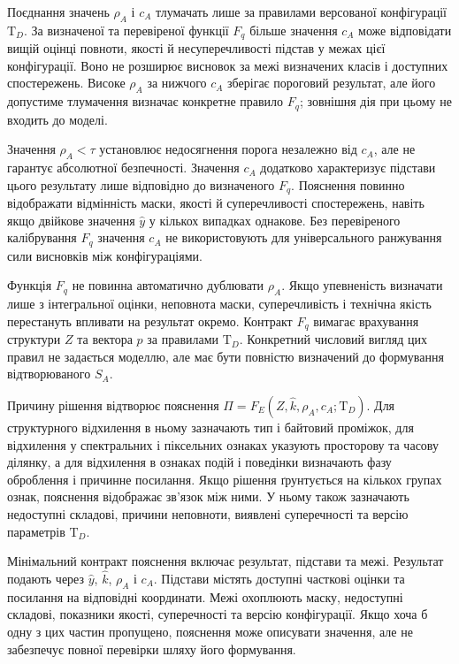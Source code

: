 Поєднання значень $\rho_A$ і $c_A$ тлумачать лише за правилами версованої конфігурації $\mathrm T_D$. За визначеної та перевіреної функції $F_q$ більше значення $c_A$ може відповідати вищій оцінці повноти, якості й несуперечливості підстав у межах цієї конфігурації. Воно не розширює висновок за межі визначених класів і доступних спостережень. Високе $\rho_A$ за нижчого $c_A$ зберігає пороговий результат, але його допустиме тлумачення визначає конкретне правило $F_q$; зовнішня дія при цьому не входить до моделі.

Значення $\rho_A<\tau$ установлює недосягнення порога незалежно від $c_A$, але не гарантує абсолютної безпечності. Значення $c_A$ додатково характеризує підстави цього результату лише відповідно до визначеного $F_q$. Пояснення повинно відображати відмінність маски, якості й суперечливості спостережень, навіть якщо двійкове значення $\hat y$ у кількох випадках однакове. Без перевіреного калібрування $F_q$ значення $c_A$ не використовують для універсального ранжування сили висновків між конфігураціями.

Функція $F_q$ не повинна автоматично дублювати $\rho_A$. Якщо упевненість визначати лише з інтегральної оцінки, неповнота маски, суперечливість і технічна якість перестануть впливати на результат окремо. Контракт $F_q$ вимагає врахування структури $Z$ та вектора $p$ за правилами $\mathrm T_D$. Конкретний числовий вигляд цих правил не задається моделлю, але має бути повністю визначений до формування відтворюваного $S_A$.

Причину рішення відтворює пояснення $\Pi=F_E(Z,\hat k,\rho_A,c_A;\mathrm T_D)$. Для структурного відхилення в ньому зазначають тип і байтовий проміжок, для відхилення у спектральних і піксельних ознаках указують просторову та часову ділянку, а для відхилення в ознаках подій і поведінки визначають фазу оброблення і причинне посилання. Якщо рішення ґрунтується на кількох групах ознак, пояснення відображає зв’язок між ними. У ньому також зазначають недоступні складові, причини неповноти, виявлені суперечності та версію параметрів $\mathrm T_D$.

Мінімальний контракт пояснення включає результат, підстави та межі. Результат подають через $\hat y$, $\hat k$, $\rho_A$ і $c_A$. Підстави містять доступні часткові оцінки та посилання на відповідні координати. Межі охоплюють маску, недоступні складові, показники якості, суперечності та версію конфігурації. Якщо хоча б одну з цих частин пропущено, пояснення може описувати значення, але не забезпечує повної перевірки шляху його формування.


